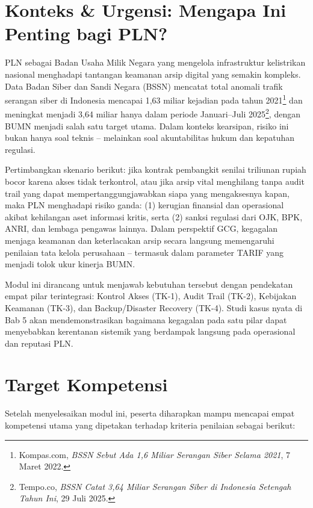 \documentclass[12pt,a4paper]{report}
\begin{document}

\section{Konteks \& Urgensi: Mengapa Ini Penting bagi PLN?}
PLN sebagai Badan Usaha Milik Negara yang mengelola infrastruktur kelistrikan nasional menghadapi tantangan keamanan arsip digital yang semakin kompleks. Data Badan Siber dan Sandi Negara (BSSN) mencatat total anomali trafik serangan siber di Indonesia mencapai 1,63 miliar kejadian pada tahun 2021\footnote{Kompas.com, \textit{BSSN Sebut Ada 1,6 Miliar Serangan Siber Selama 2021}, 7 Maret 2022.} dan meningkat menjadi 3,64 miliar hanya dalam periode Januari--Juli 2025\footnote{Tempo.co, \textit{BSSN Catat 3,64 Miliar Serangan Siber di Indonesia Setengah Tahun Ini}, 29 Juli 2025.}, dengan BUMN menjadi salah satu target utama. Dalam konteks kearsipan, risiko ini bukan hanya soal teknis -- melainkan soal akuntabilitas hukum dan kepatuhan regulasi.

Pertimbangkan skenario berikut: jika kontrak pembangkit senilai triliunan rupiah bocor karena akses tidak terkontrol, atau jika arsip vital menghilang tanpa audit trail yang dapat mempertanggungjawabkan siapa yang mengaksesnya kapan, maka PLN menghadapi risiko ganda: (1) kerugian finansial dan operasional akibat kehilangan aset informasi kritis, serta (2) sanksi regulasi dari OJK, BPK, ANRI, dan lembaga pengawas lainnya. Dalam perspektif GCG, kegagalan menjaga keamanan dan keterlacakan arsip secara langsung memengaruhi penilaian tata kelola perusahaan -- termasuk dalam parameter TARIF yang menjadi tolok ukur kinerja BUMN.

Modul ini dirancang untuk menjawab kebutuhan tersebut dengan pendekatan empat pilar terintegrasi: Kontrol Akses (TK-1), Audit Trail (TK-2), Kebijakan Keamanan (TK-3), dan Backup/Disaster Recovery (TK-4). Studi kasus nyata di Bab 5 akan mendemonstrasikan bagaimana kegagalan pada satu pilar dapat menyebabkan kerentanan sistemik yang berdampak langsung pada operasional dan reputasi PLN.


\section{Target Kompetensi}
Setelah menyelesaikan modul ini, peserta diharapkan mampu mencapai empat kompetensi utama yang dipetakan terhadap kriteria penilaian sebagai berikut:
\end{document}
